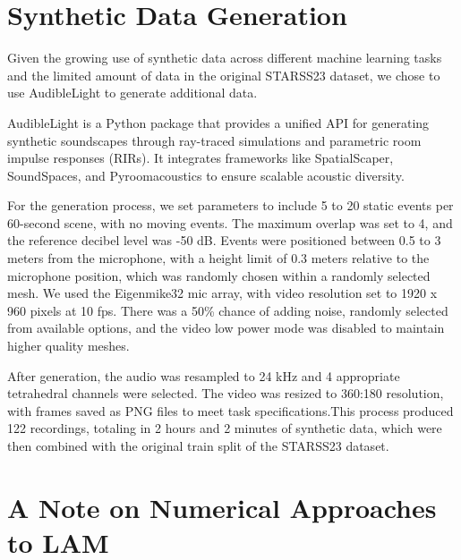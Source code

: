 \documentclass{article}
\begin{document}
\begin{sloppy}
\section{Synthetic Data Generation}
\label{sec:pagelimit}
Given the growing use of synthetic data across different machine learning tasks and the limited amount of data in the original STARSS23 dataset, we chose to use AudibleLight to generate additional data.

AudibleLight is a Python package that provides a unified API for generating synthetic soundscapes through ray-traced simulations and parametric room impulse responses (RIRs). It integrates frameworks like SpatialScaper, SoundSpaces, and Pyroomacoustics to ensure scalable acoustic diversity.

For the generation process, we set parameters to include 5 to 20 static events per 60-second scene, with no moving events. The maximum overlap was set to 4, and the reference decibel level was -50 dB. Events were positioned between 0.5 to 3 meters from the microphone, with a height limit of 0.3 meters relative to the microphone position, which was randomly chosen within a randomly selected mesh. We used the Eigenmike32 mic array, with video resolution set to 1920 x 960 pixels at 10 fps. There was a 50\% chance of adding noise, randomly selected from available options, and the video low power mode was disabled to maintain higher quality meshes.

After generation, the audio was resampled to 24 kHz and 4 appropriate tetrahedral channels were selected. The video was resized to 360:180 resolution, with frames saved as PNG files to meet task specifications.This process produced 122 recordings, totaling in 2 hours and 2 minutes of synthetic data, which were then combined with the original train split of the STARSS23 dataset.




\section{A Note on Numerical Approaches to LAM}
\label{sec:solver}


\end{sloppy}
\end{document}
